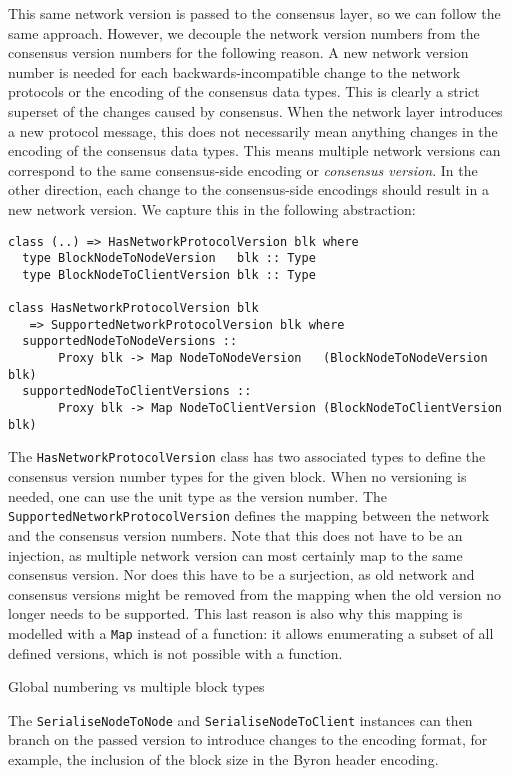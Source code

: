 This same network version is passed to the consensus layer, so we can follow the
same approach. However, we decouple the network version numbers from the
consensus version numbers for the following reason. A new network version number
is needed for each backwards-incompatible change to the network protocols or the
encoding of the consensus data types. This is clearly a strict superset of the
changes caused by consensus. When the network layer introduces a new protocol
message, this does not necessarily mean anything changes in the encoding of the
consensus data types. This means multiple network versions can correspond to the
same consensus-side encoding or \emph{consensus version}. In the other
direction, each change to the consensus-side encodings should result in a new
network version. We capture this in the following abstraction:
\begin{lstlisting}
class (..) => HasNetworkProtocolVersion blk where
  type BlockNodeToNodeVersion   blk :: Type
  type BlockNodeToClientVersion blk :: Type

class HasNetworkProtocolVersion blk
   => SupportedNetworkProtocolVersion blk where
  supportedNodeToNodeVersions ::
       Proxy blk -> Map NodeToNodeVersion   (BlockNodeToNodeVersion   blk)
  supportedNodeToClientVersions ::
       Proxy blk -> Map NodeToClientVersion (BlockNodeToClientVersion blk)
\end{lstlisting}
The \lstinline!HasNetworkProtocolVersion! class has two associated types to
define the consensus version number types for the given block. When no
versioning is needed, one can use the unit type as the version number. The
\lstinline!SupportedNetworkProtocolVersion! defines the mapping between the
network and the consensus version numbers. Note that this does not have to be an
injection, as multiple network version can most certainly map to the same
consensus version. Nor does this have to be a surjection, as old network and
consensus versions might be removed from the mapping when the old version no
longer needs to be supported. This last reason is also why this mapping is
modelled with a \lstinline!Map! instead of a function: it allows enumerating a
subset of all defined versions, which is not possible with a function.

 Global numbering vs multiple block types

The \lstinline!SerialiseNodeToNode! and \lstinline!SerialiseNodeToClient!
instances can then branch on the passed version to introduce changes to the
encoding format, for example, the inclusion of the block size in the Byron
header encoding.

